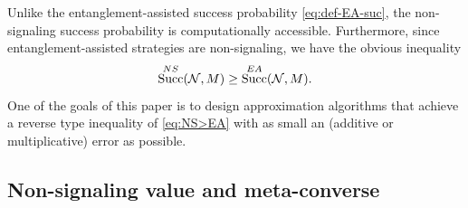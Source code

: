 \documentclass[a4paper,onecolumn,11pt,accepted=2025-10-01]{quantumarticle}
\DeclareMathOperator{\suc}{Succ}
\newcommand*{\cN}{\mathcal{N}}
\begin{document}
Unlike the entanglement-assisted success probability \eqref{eq:def-EA-suc}, the non-signaling success probability is computationally accessible. Furthermore, since entanglement-assisted strategies are non-signaling, we have the obvious inequality
\begin{equation}\label{eq:NS>EA}
    \suc^{\rm{NS}}(\cN, M)\ge \suc^{\rm{EA}}(\cN, M).
\end{equation}
One of the goals of this paper is to design approximation algorithms that achieve a reverse type inequality of \eqref{eq:NS>EA} with as small an (additive or multiplicative) error as possible.


\subsection{Non-signaling value and meta-converse}\label{sec:NS-MC}
\end{document}
